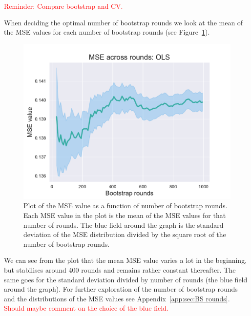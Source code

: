 \documentclass[twocolumn,english,notitlepage]{article}
\newcommand{\comment}[1]{\textcolor{red}{#1}}
\begin{document}
            \comment{Reminder: Compare bootstrap and CV.}

        

            When deciding the optimal number of bootstrap rounds we look at the mean of the MSE values for each number of bootstrap rounds (see Figure~\ref{res:fig:bs_mse_across_rounds}). 
            \begin{figure}[ht]
                \centering
                \includegraphics[width=\linewidth]{BS_mse_across_rounds_OLS.pdf}
                \caption{Plot of the MSE value as a function of number of bootstrap rounds. Each MSE value in the plot is the mean of the MSE values for that number of rounds. The blue field around the graph is the standard deviation of the MSE distribution divided by the square root of the number of bootstrap rounds.}
                \label{res:fig:bs_mse_across_rounds}
            \end{figure}
            We can see from the plot that the mean MSE value varies a lot in the beginning, but stabilises around 400 rounds and remains rather constant thereafter. The same goes for the standard deviation divided by number of rounds (the blue field around the graph). For further exploration of the number of bootstrap rounds and the distributions of the MSE values see Appendix~\ref{app:sec:BS rounds}. 
            \comment{Should maybe comment on the choice of the blue field.}
\end{document}
